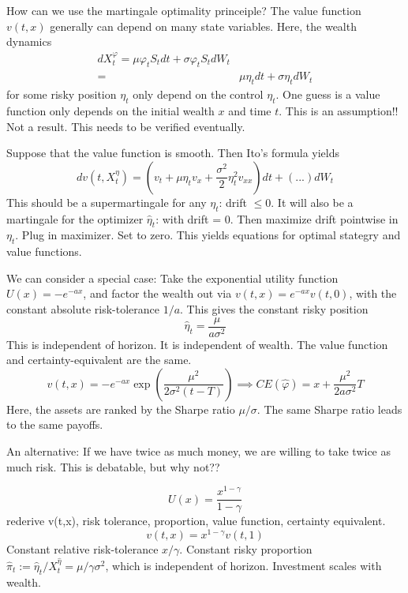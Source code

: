How can we use the martingale optimality princeiple? The value function $v(t,x)$ generally can depend on many state variables. Here, the wealth dynamics
\begin{align}
	d X_t^\varphi = \mu \varphi_t S_t dt + \sigma \varphi_t S_t dW_t\\
			=& \mu \eta_t dt + \sigma \eta_t dW_t
\end{align}
for some risky position $\eta_t$ only depend on the control $\eta_t$. One guess is a value function only depends on the initial wealth $x$ and time $t$. This is an assumption!! Not a result. This needs to be verified eventually.

Suppose that the value function is smooth. Then Ito's formula yields
\begin{equation}
	dv(t, X^\eta_t) = (v_t + \mu \eta_t v_x + \frac{\sigma^2}{2}\eta^2_t v_{xx})dt + (...) dW_t
\end{equation}
This should be a supermartingale for any $\eta_t$: drift $\leq 0$. It will also be a martingale for the optimizer $\hat{\eta}_t$: with drift = 0. Then maximize drift pointwise in $\eta_t$. Plug in maximizer. Set to zero. This yields equations for optimal stategry and value functions.


We can consider a special case: Take the exponential utility function $U(x) = -e^{-ax}$, and factor the wealth out via $v(t,x) = e^{-ax}v(t,0)$, with the constant absolute risk-tolerance $1/a$. This gives the constant risky position
\begin{equation}
	\hat{\eta}_t = \frac{\mu}{a \sigma^2}
\end{equation}
This is independent of horizon. It is independent of wealth. The value function and certainty-equivalent are the same.
\begin{equation}
	v(t,x) = -e^{-ax} \exp(\frac{\mu^2}{2\sigma^2(t-T)}) \implies CE(\hat{\varphi}) = x + \frac{\mu^2}{2 a \sigma^2} T
\end{equation}
Here, the assets are ranked by the Sharpe ratio $\mu/\sigma$. The same Sharpe ratio leads to the same payoffs.


An alternative: If we have twice as much money, we are willing to take twice as much risk. This is debatable, but why not??

\begin{equation}
	U(x) = \frac{x^{1-\gamma}}{1-\gamma} 
\end{equation}
rederive v(t,x), risk tolerance, proportion, value function, certainty equivalent.
\begin{equation}
	v(t,x) = x^{1-\gamma} v(t,1)
\end{equation}
Constant relative risk-tolerance $x/\gamma$.
Constant risky proportion $\hat{\pi}_t := \hat{\eta}_t / X^{\hat{\eta}}_{t} = \mu / \gamma \sigma^2$, which is independent of horizon.
Investment scales with wealth.

